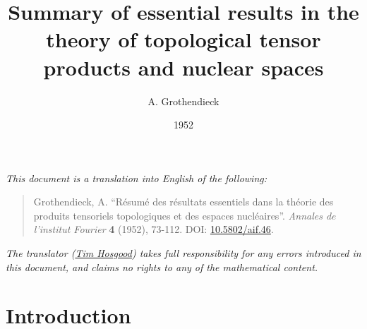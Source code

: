 \documentclass[british]{article}
\title{Summary of essential results in the theory of topological tensor
products and nuclear spaces}
\author{A. Grothendieck}
\date{1952}
\begin{document}
\maketitle
\thispagestyle{fancy}

\setcounter{footnote}{0}



\emph{This document is a translation into English of the following:}

\begin{quote}
Grothendieck, A. ``Résumé des résultats essentiels dans la théorie des
produits tensoriels topologiques et des espaces nucléaires''.
\emph{Annales de l'institut Fourier} \textbf{4} (1952), 73-112. DOI:
\href{https://doi.org/10.5802/aif.46}{10.5802/aif.46}.
\end{quote}

\emph{The translator (\href{https://thosgood.net}{Tim Hosgood}) takes
full responsibility for any errors introduced in this document, and
claims no rights to any of the mathematical content.}

\tableofcontents

\providecommand{\scr}[1]{{\mathscr{#1}}}
\renewcommand{\cal}[1]{{\mathcal{#1}}}
\renewcommand{\frak}[1]{{\mathfrak{#1}}}
\renewcommand{\geq}{\geqslant}
\renewcommand{\leq}{\leqslant}

\providecommand{\BB}{\mathrm{B}}
\providecommand{\LL}{\mathrm{L}}
\providecommand{\JJ}{\mathrm{J}}
\providecommand{\CC}{\mathrm{C}}
\providecommand{\RR}{\mathbb{R}}
\renewcommand{\ll}{\ell}
\providecommand{\sBB}{\mathscr{B}}
\providecommand{\sDD}{\mathscr{D}}
\providecommand{\sEE}{\mathscr{E}}
\providecommand{\sHH}{\mathscr{H}}
\providecommand{\sLL}{\mathscr{L}}
\providecommand{\sOO}{\mathscr{O}}
\providecommand{\sSS}{\mathscr{S}}
\providecommand{\DD}{(\mathscr{D})}
\providecommand{\DDp}{(\mathscr{D}')}
\providecommand{\DF}{(\mathscr{DF})}
\providecommand{\FF}{(\mathscr{F})}
\providecommand{\LF}{(\mathscr{LF})}
\providecommand{\MM}{(\mathscr{M})}
\providecommand{\hotimes}{\hat{\otimes}}
\providecommand{\scr}{\mathscr}
\providecommand{\dd}{\mathrm{d}}
\providecommand{\lotimes}{\bar{\otimes}}
\providecommand{\potimes}[1][p]{\overset{(#1)}{\otimes}}
\providecommand{\spotimes}[1][p]{\overset{[#1]}{\otimes}}
\providecommand{\Tr}{\operatorname{Tr}}
\providecommand{\hhotimes}{\hat{\hat{\otimes}}}

\section*{Introduction}\label{introduction}
\end{document}
